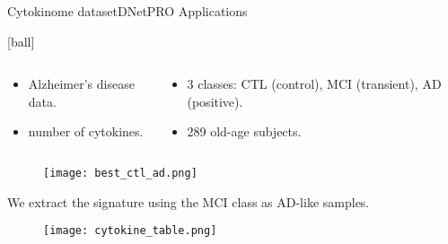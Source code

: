 \documentclass{standalone}
\begin{document}
\begin{frame}{Cytokinome dataset}{DNetPRO Applications}

  [ball]

  \begin{columns}

    \begin{column}{0.5\linewidth}

      \begin{itemize}
        \item Alzheimer's disease data.
        \item {} number of cytokines.
      \end{itemize}

    \end{column}

    \begin{column}{0.5\linewidth}

      \begin{itemize}
        \item 3 classes: CTL (control), MCI (transient), AD (positive).
        \item 289 old-age subjects.
      \end{itemize}

    \end{column}

  \end{columns}

  \begin{figure}
    \centering
    \texttt{[image: best\_ctl\_ad.png]}
  \end{figure}

  \scriptsize{We extract the signature using the MCI class as AD-like samples.}

  \begin{figure}
    \centering
    \texttt{[image: cytokine\_table.png]}
  \end{figure}

\end{frame}
\end{document}
